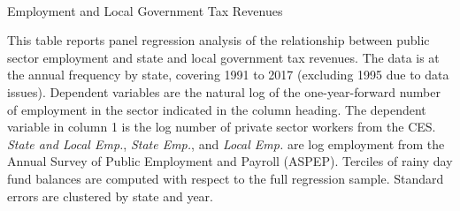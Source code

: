 \begin{landscape}

\begin{table}[!ht]
\begin{center}
\begin{threeparttable}


\caption{\\ Employment and Local Government Tax Revenues}
\label{table:layoffRainyDayPanel}

\centering 

\begin{small}

	

\end{small}

\begin{footnotesize}
\begin{tablenotes}
\item This table reports panel regression analysis of the relationship between public sector employment and state and local government tax revenues. The data is at the annual frequency by state, covering 1991 to 2017 (excluding 1995 due to data issues). Dependent variables are the natural log of the one-year-forward number of employment in the sector indicated in the column heading. The dependent variable in column 1 is the log number of private sector workers from the CES. \emph{State and Local Emp.}, \emph{State Emp.}, and \emph{Local Emp.} are log employment from the Annual Survey of Public Employment and Payroll (ASPEP). Terciles of rainy day fund balances are computed with respect to the full regression sample.  Standard errors are clustered by state and year.
\end{tablenotes}
\end{footnotesize}

\end{threeparttable}
\end{center}

\end{table}

\thispagestyle{empty}
\end{landscape}




